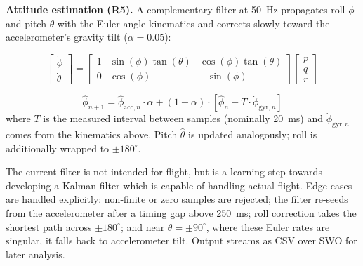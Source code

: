 \documentclass[10pt,letterpaper]{article}
\begin{document}
\textbf{Attitude estimation (R5).} A complementary filter at 50~Hz propagates roll $\phi$ and
pitch $\theta$ with the Euler-angle kinematics and corrects slowly toward the
accelerometer's gravity tilt ($\alpha = 0.05$):

\[
\begin{bmatrix}
    \dot{\phi} \\
    \dot{\theta}
\end{bmatrix}
=
\begin{bmatrix}
    1 & \sin(\phi)\tan(\theta) & \cos(\phi)\tan(\theta) \\
    0 & \cos(\phi)             & -\sin(\phi)
\end{bmatrix}
\begin{bmatrix}
    p \\
    q \\
    r
\end{bmatrix}
\]

\[
\hat{\phi}_{n+1}
=
\hat{\phi}_{\mathrm{acc},n}\cdot\alpha
+
(1-\alpha)\cdot
\left[
    \hat{\phi}_n + T\cdot\dot{\phi}_{\mathrm{gyr},n}
\right]
\]
where $T$ is the measured interval between samples (nominally 20~ms) and $\dot{\phi}_{\mathrm{gyr},n}$
comes from the kinematics above. Pitch $\hat{\theta}$ is updated analogously; roll is additionally
wrapped to $\pm180^\circ$.

The current filter is not intended for flight, but is a learning step towards developing a Kalman filter which is capable of 
handling actual flight. Edge cases are handled explicitly: 
non-finite or zero samples are rejected; the filter re-seeds from the accelerometer after a timing gap above 250~ms; 
roll correction takes the shortest path across $\pm180^\circ$; and near $\theta=\pm90^\circ$, where these 
Euler rates are singular, it falls back to accelerometer tilt. Output streams as CSV over SWO for later analysis.

\end{document}

